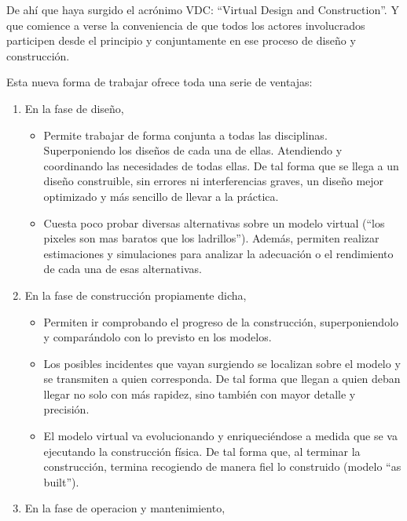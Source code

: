 \documentclass[spanish,12pt,a4paper,final,oneside]{book}
\begin{document}
De ahí que haya surgido el acrónimo VDC: ``Virtual Design and Construction''. Y que comience a verse la conveniencia de que todos los actores involucrados participen desde el principio y conjuntamente en ese proceso de diseño y construcción. 

Esta nueva forma de trabajar ofrece toda una serie de ventajas:
\begin{enumerate}

\item En la fase de diseño,
\begin{itemize}

\item Permite trabajar de forma conjunta a todas las disciplinas. Superponiendo los diseños de cada una de ellas. Atendiendo y coordinando las necesidades de todas ellas. De tal forma que se llega a un diseño construible, sin errores ni interferencias graves, un diseño mejor optimizado y más sencillo de llevar a la práctica.

\item Cuesta poco probar diversas alternativas sobre un modelo virtual (“los pixeles son mas baratos que los ladrillos”). Además, permiten realizar estimaciones y simulaciones para analizar la adecuación o el rendimiento de cada una de esas alternativas.

\end{itemize}

\item En la fase de construcción propiamente dicha, 
\begin{itemize}

\item Permiten ir comprobando el progreso de la construcción, superponiendolo y comparándolo con lo previsto en los modelos.

\item Los posibles incidentes que vayan surgiendo se localizan sobre el modelo y se transmiten a quien corresponda. De tal forma que llegan a quien deban llegar no solo con más rapidez, sino también con mayor detalle y precisión.  

\item El modelo virtual va evolucionando y enriqueciéndose a medida que se va ejecutando la construcción física. De tal forma que, al terminar la construcción, termina recogiendo de manera fiel lo construido (modelo ``as built'').
\end{itemize}

\item En la fase de operacion y mantenimiento,
\begin{itemize}


\end{itemize}
\end{enumerate}
\end{document}
